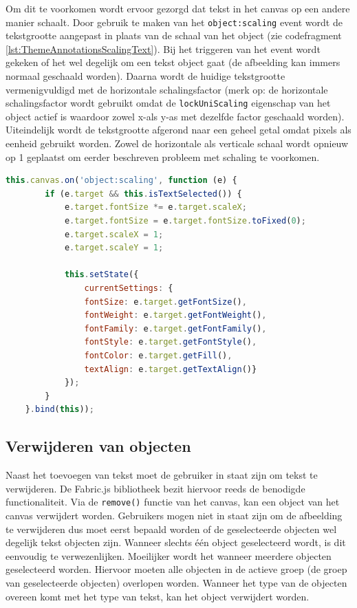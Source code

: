 Om dit te voorkomen wordt ervoor gezorgd dat tekst in het canvas op een andere manier schaalt. Door gebruik te maken van het \texttt{object:scaling} event wordt de tekstgrootte aangepast in plaats van de schaal van het object (zie codefragment \ref{lst:ThemeAnnotationsScalingText}). Bij het triggeren van het event wordt gekeken of het wel degelijk om een tekst object gaat (de afbeelding kan immers normaal geschaald worden). Daarna wordt de huidige tekstgrootte vermenigvuldigd met de horizontale schalingsfactor (merk op: de horizontale schalingsfactor wordt gebruikt omdat de \texttt{lockUniScaling} eigenschap van het object actief is waardoor zowel x-als y-as met dezelfde factor geschaald worden). Uiteindelijk wordt de tekstgrootte afgerond naar een geheel getal omdat pixels als eenheid gebruikt worden. Zowel de horizontale als verticale schaal wordt opnieuw op 1 geplaatst om eerder beschreven probleem met schaling te voorkomen. 

\begin{lstlisting}[caption={ThemeAnnotations component - Schalen van tekst},label=lst:ThemeAnnotationsScalingText,language=javascript]
	this.canvas.on('object:scaling', function (e) {
		if (e.target && this.isTextSelected()) {
			e.target.fontSize *= e.target.scaleX;
			e.target.fontSize = e.target.fontSize.toFixed(0);
			e.target.scaleX = 1;
			e.target.scaleY = 1;
			
			this.setState({
				currentSettings: {
				fontSize: e.target.getFontSize(),
				fontWeight: e.target.getFontWeight(),
				fontFamily: e.target.getFontFamily(),
				fontStyle: e.target.getFontStyle(),
				fontColor: e.target.getFill(),
				textAlign: e.target.getTextAlign()}
			});
		}
	}.bind(this));
\end{lstlisting}

\subsection{Verwijderen van objecten}
Naast het toevoegen van tekst moet de gebruiker in staat zijn om tekst te verwijderen. De Fabric.js bibliotheek bezit hiervoor reeds de benodigde functionaliteit. Via de \texttt{remove()} functie van het canvas, kan een object van het canvas verwijdert worden. Gebruikers mogen niet in staat zijn om de afbeelding te verwijderen dus moet eerst bepaald worden of de geselecteerde objecten wel degelijk tekst objecten zijn. Wanneer slechts \'{e}\'{e}n object geselecteerd wordt, is dit eenvoudig te verwezenlijken. Moeilijker wordt het wanneer meerdere objecten geselecteerd worden. Hiervoor moeten alle objecten in de actieve groep (de groep van geselecteerde objecten) overlopen worden. Wanneer het type van de objecten overeen komt met het type van tekst, kan het object verwijdert worden. 

